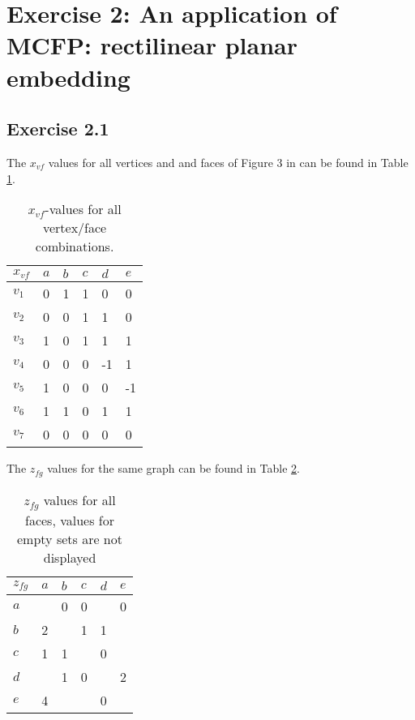 \section{Exercise 2: An application of MCFP: rectilinear planar embedding}

\subsection{Exercise 2.1}

The $x_{vf}$ values for all vertices and and faces of Figure
3 in \cite{assignment1} can be found in Table \ref{table:xvf}.

\begin{table}[h]
\centering
\begin{tabular}{l|lllll}
$x_{vf}$ & $a$ & $b$ & $c$ & $d$ & $e$ \\ \hline
$v_1$   & 0   & 1   & 1   & 0   & 0   \\
$v_2$   & 0   & 0   & 1   & 1   & 0   \\
$v_3$   & 1   & 0   & 1   & 1   & 1   \\
$v_4$   & 0   & 0   & 0   & -1  & 1   \\
$v_5$   & 1   & 0   & 0   & 0   & -1  \\
$v_6$   & 1   & 1   & 0   & 1   & 1   \\
$v_7$   & 0   & 0   & 0   & 0   & 0
\end{tabular}
\label{table:xvf}
\caption{$x_{vf}$-values for all vertex/face combinations.}
\end{table}

The $z_{fg}$ values for the same graph can be found in Table \ref{table:zfg}.

\begin{table}[h]
\centering
\begin{tabular}{l|lllll}
$z_{fg}$ & $a$ & $b$ & $c$ & $d$ & $e$ \\ \hline
$a$     &     & 0   & 0   &     & 0   \\
$b$     & 2   &     & 1   & 1   &     \\
$c$     & 1   & 1   &     & 0   &     \\
$d$     &     & 1   & 0   &     & 2   \\
$e$     & 4   &     &     & 0   &
\end{tabular}
\label{table:zfg}
\caption{$z_{fg}$ values for all faces, values for empty sets are not displayed}
\end{table}

